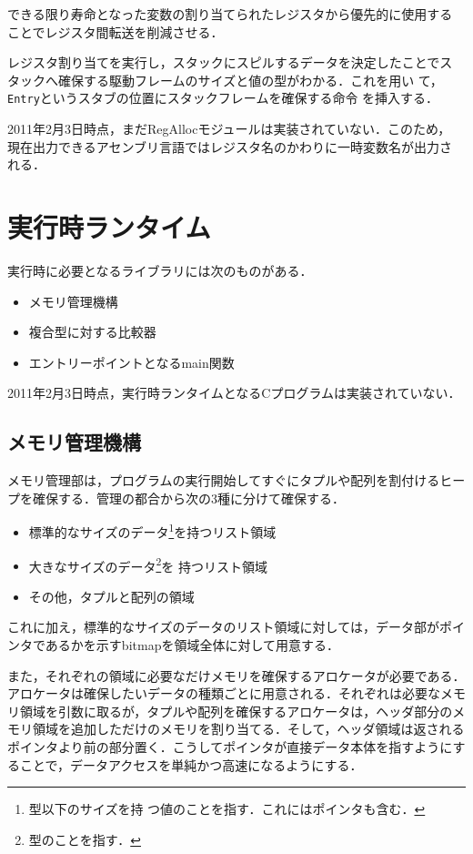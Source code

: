 \documentclass[a4paper,titlepage,disablejfam]{jsbook}
\begin{document}
 できる限り寿命となった変数の割り当てられたレジスタから優先的に使用する
 ことでレジスタ間転送を削減させる．

 レジスタ割り当てを実行し，スタックにスピルするデータを決定したことでス
 タックへ確保する駆動フレームのサイズと値の型がわかる．これを用い
 て，\lstinline|Entry|というスタブの位置にスタックフレームを確保する命令
 を挿入する．

 2011年2月3日時点，まだRegAllocモジュールは実装されていない．このため，
 現在出力できるアセンブリ言語ではレジスタ名のかわりに一時変数名が出力さ
 れる．


\section{実行時ランタイム}\label{sc:impl-runtime}
 実行時に必要となるライブラリには次のものがある．
\begin{itemize}
 \item メモリ管理機構
 \item 複合型に対する比較器
 \item エントリーポイントとなるmain関数
\end{itemize}
 
 2011年2月3日時点，実行時ランタイムとなるCプログラムは実装されていない．

\subsection{メモリ管理機構}
メモリ管理部は，プログラムの実行開始してすぐにタプルや配列を割付けるヒー
プを確保する．管理の都合から次の3種に分けて確保する．
\begin{itemize}
 \item 標準的なサイズのデータ\footnote{型以下のサイズを持
       つ値のことを指す．これにはポインタも含む．}を持つリスト領域
 \item 大きなサイズのデータ\footnote{型のことを指す．}を
       持つリスト領域
 \item その他，タプルと配列の領域
\end{itemize}

これに加え，標準的なサイズのデータのリスト領域に対しては，データ部がポイ
ンタであるかを示すbitmapを領域全体に対して用意する．

また，それぞれの領域に必要なだけメモリを確保するアロケータが必要である．
アロケータは確保したいデータの種類ごとに用意される．それぞれは必要なメモ
リ領域を引数に取るが，タプルや配列を確保するアロケータは，ヘッダ部分のメ
モリ領域を追加しただけのメモリを割り当てる．そして，ヘッダ領域は返される
ポインタより前の部分置く．こうしてポインタが直接データ本体を指すようにす
ることで，データアクセスを単純かつ高速になるようにする．
\end{document}
